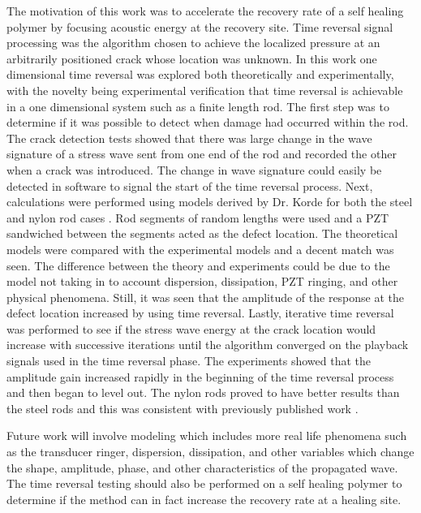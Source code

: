 
The motivation of this work was to accelerate the recovery rate of a self healing polymer by focusing acoustic energy at the recovery site. Time reversal signal processing was the algorithm chosen to achieve the localized pressure at an arbitrarily positioned crack whose location was unknown. In this work one dimensional time reversal was explored both theoretically and experimentally, with the novelty being experimental verification that time reversal is achievable in a one dimensional system such as a finite length rod. The first step was to determine if it was possible to detect when damage had occurred within the rod. The crack detection tests showed that there was large change in the wave signature of a stress wave sent from one end of the rod and recorded the other when a crack was introduced. The change in wave signature could easily be detected in software to signal the start of the time reversal process. Next, calculations were performed using models derived by Dr. Korde for both the steel and nylon rod cases \cite{Fehrman2012}. Rod segments of random lengths were used and a PZT sandwiched between the segments acted as the defect location. The theoretical models were compared with the experimental models and a decent match was seen. The difference between the theory and experiments could be due to the model not taking in to account dispersion, dissipation, PZT ringing, and other physical phenomena. Still, it was seen that the amplitude of the response at the defect location increased by using time reversal. Lastly, iterative time reversal was performed to see if the stress wave energy at the crack location would increase with successive iterations until the algorithm converged on the playback signals used in the time reversal phase. The experiments showed that the amplitude gain increased rapidly in the beginning of the time reversal process and then began to level out. The nylon rods proved to have better results than the steel rods and this was consistent with previously published work \cite{Fink1993}. 

Future work will involve modeling which includes more real life phenomena such as the transducer ringer, dispersion, dissipation, and other variables which change the shape, amplitude, phase, and other characteristics of the propagated wave. The time reversal testing should also be performed on a self healing polymer to determine if the method can in fact increase the recovery rate at a healing site.

